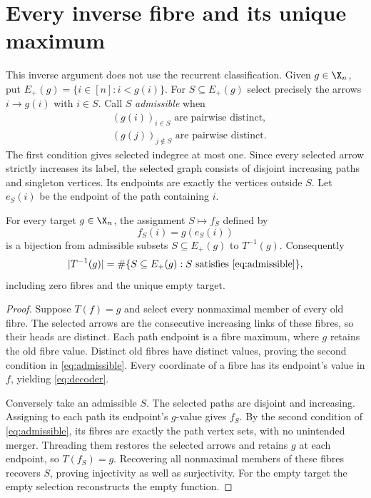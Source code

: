\section{Every inverse fibre and its unique maximum}\label{sec:inverse}

This inverse argument does not use the recurrent classification. Given
$g\in\X_n$, put $E_+(g)=\{i\in[n]:i<g(i)\}$. For
$S\subseteq E_+(g)$ select precisely the arrows $i\to g(i)$ with
$i\in S$. Call $S$ \emph{admissible} when
\begin{equation}\label{eq:admissible}
 \begin{split}
 &(g(i))_{i\in S}\text{ are pairwise distinct},\\
 &(g(j))_{j\notin S}\text{ are pairwise distinct}.
 \end{split}
\end{equation}
The first condition gives selected indegree at most one. Since every
selected arrow strictly increases its label, the selected graph consists
of disjoint increasing paths and singleton vertices. Its endpoints are
exactly the vertices outside $S$. Let $e_S(i)$ be the endpoint of the
path containing $i$.

\begin{theorem}\label{thm:inverse}
For every target $g\in\X_n$, the assignment $S\mapsto f_S$ defined by
\begin{equation}\label{eq:decoder}
 f_S(i)=g(e_S(i))
\end{equation}
is a bijection from admissible subsets $S\subseteq E_+(g)$ to $T^{-1}(g)$.
Consequently
\begin{equation}\label{eq:fibre}
 |T^{-1}(g)|=\#\{S\subseteq E_+(g):S\text{ satisfies }\eqref{eq:admissible}\},
\end{equation}
including zero fibres and the unique empty target.
\end{theorem}

\begin{proof}
Suppose $T(f)=g$ and select every nonmaximal member of every old fibre.
The selected arrows are the consecutive increasing links of these fibres,
so their heads are distinct. Each path endpoint is a fibre maximum, where
$g$ retains the old fibre value. Distinct old fibres have distinct values,
proving the second condition in \eqref{eq:admissible}. Every coordinate
of a fibre has its endpoint's value in $f$, yielding \eqref{eq:decoder}.

Conversely take an admissible $S$. The selected paths are disjoint and
increasing. Assigning to each path its endpoint's $g$-value gives $f_S$.
By the second condition of \eqref{eq:admissible}, its fibres are exactly
the path vertex sets, with no unintended merger. Threading them restores
the selected arrows and retains $g$ at each endpoint, so $T(f_S)=g$.
Recovering all nonmaximal members of these fibres recovers $S$, proving
injectivity as well as surjectivity. For the empty target the empty
selection reconstructs the empty function.
\end{proof}


